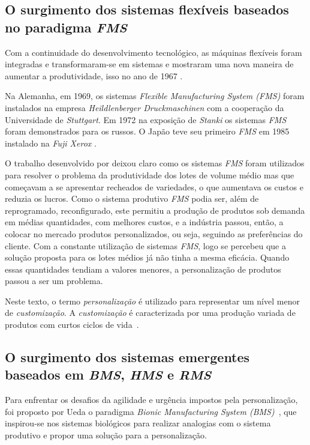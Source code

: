 \subsection{O surgimento dos sistemas flexíveis baseados no paradigma \textit{FMS}}	

Com a continuidade do desenvolvimento tecnológico, as máquinas flexíveis foram integradas e transformaram-se em sistemas e mostraram uma nova maneira de aumentar a produtividade, isso no ano de 1967 \cite{KOREN1999}.

Na Alemanha, em 1969, os sistemas \textit{Flexible Manufacturing System (FMS)}  foram instalados na empresa \textit{Heildlenberger Druckmaschinen} com a cooperação da Universidade de \textit{Stuttgart}. Em 1972 na exposição de \textit{Stanki} os sistemas \textit{FMS} foram demonstrados para os russos. O Japão teve seu primeiro \textit{FMS} em 1985 instalado na \textit{Fuji Xerox} \cite{GROOVER2011}. 

O trabalho desenvolvido por  deixou claro como os sistemas \textit{FMS} foram utilizados para resolver o problema da produtividade dos lotes de volume médio mas que começavam a se apresentar recheados de variedades, o que aumentava os custos e reduzia os lucros. Como o sistema produtivo \textit{FMS} podia ser, além de reprogramado, reconfigurado, este permitiu a produção de produtos sob demanda em médias quantidades, com melhores custos, e a indústria passou, então, a colocar no mercado produtos personalizados, ou seja, seguindo as preferências do cliente. Com a constante utilização de sistemas \textit{FMS}, logo se percebeu que a solução proposta para os lotes médios já não tinha a mesma eficácia. Quando essas quantidades tendiam a valores menores, a personalização de produtos passou a ser um problema. 

Neste texto, o termo \textit{personalização} é utilizado para representar um nível menor de \textit{customização}. A \textit{customização} é caracterizada por uma produção variada de produtos com curtos ciclos de vida~\cite{QUINTELA2005}.

\subsection{O surgimento dos sistemas emergentes baseados em \textit{BMS}, \textit{HMS} e \textit{RMS}}

Para enfrentar os desafios da agilidade e urgência impostos pela personalização, foi proposto por Ueda o paradigma \textit{Bionic Manufacturing System (BMS)}~\cite{UEDA1992}, que inspirou-se nos sistemas biológicos para realizar analogias com o  sistema produtivo e propor uma solução para a personalização. 

